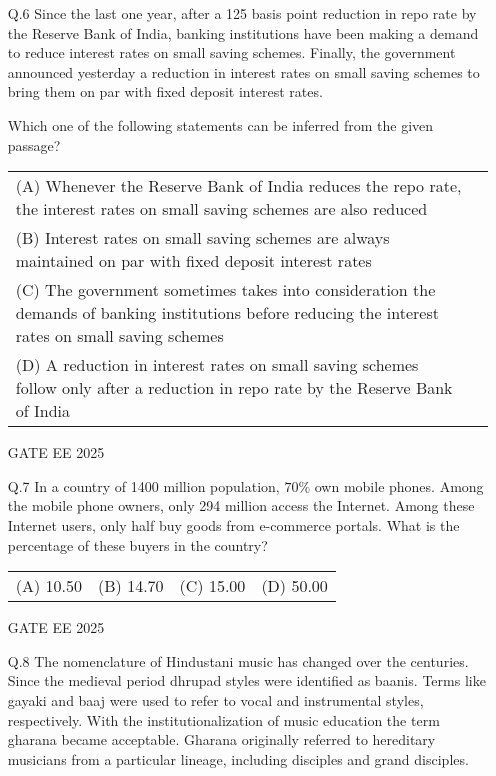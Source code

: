 \documentclass{article}
\begin{document}
\begin{enumerate}[leftmargin=*]
    \item[Q.6] Since the last one year, after a 125 basis point reduction in repo rate by the Reserve Bank of India, banking institutions have been making a demand to reduce interest rates on small saving schemes. Finally, the government announced yesterday a reduction in interest rates on small saving schemes to bring them on par with fixed deposit interest rates.
    
    Which one of the following statements can be inferred from the given passage?
    
    \begin{tabular}{ll}
        (A) Whenever the Reserve Bank of India reduces the repo rate, the interest rates on small saving schemes are also reduced \\
        (B) Interest rates on small saving schemes are always maintained on par with fixed deposit interest rates \\
        (C) The government sometimes takes into consideration the demands of banking institutions before reducing the interest rates on small saving schemes \\
        (D) A reduction in interest rates on small saving schemes follow only after a reduction in repo rate by the Reserve Bank of India
    \end{tabular}
    GATE EE 2025
     \vspace{0.5cm} 
    \item[Q.7] In a country of 1400 million population, $70\%$ own mobile phones. Among the mobile phone owners, only 294 million access the Internet. Among these Internet users, only half buy goods from e-commerce portals. What is the percentage of these buyers in the country?
    
    \begin{tabular}{llll}
        (A) 10.50 & (B) 14.70 & (C) 15.00 & (D) 50.00
    \end{tabular}
    GATE EE 2025
     \vspace{0.5cm} 
    \item[Q.8] The nomenclature of Hindustani music has changed over the centuries. Since the medieval period dhrupad styles were identified as baanis. Terms like gayaki and baaj were used to refer to vocal and instrumental styles, respectively. With the institutionalization of music education the term gharana became acceptable. Gharana originally referred to hereditary musicians from a particular lineage, including disciples and grand disciples.
    

\end{enumerate}
\end{document}

